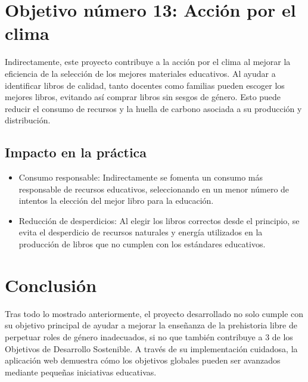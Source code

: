 \section{Objetivo número 13: Acción por el clima}
Indirectamente, este proyecto contribuye a la acción por el clima al mejorar la eficiencia de la selección de los mejores materiales educativos. Al ayudar a identificar libros de calidad, tanto docentes como familias pueden escoger los mejores libros, evitando así comprar libros sin sesgos de género. Esto puede reducir el consumo de recursos y la huella de carbono asociada a su producción y distribución.

\subsection{Impacto en la práctica}
\begin{itemize}
    \item Consumo responsable: Indirectamente se fomenta un consumo más responsable de recursos educativos, seleccionando en un menor número de intentos la elección del mejor libro para la educación.
    \item Reducción de desperdicios: Al elegir los libros correctos desde el principio, se evita el desperdicio de recursos naturales y energía utilizados en la producción de libros que no cumplen con los estándares educativos.
\end{itemize}

\section{Conclusión}
Tras todo lo mostrado anteriormente, el proyecto desarrollado no solo cumple con su objetivo principal de ayudar a mejorar la enseñanza de la prehistoria libre de perpetuar roles de género inadecuados, si no que también contribuye a 3 de los Objetivos de Desarrollo Sostenible. A través de su implementación cuidadosa, la aplicación web demuestra cómo los objetivos globales pueden ser avanzados mediante pequeñas iniciativas educativas.